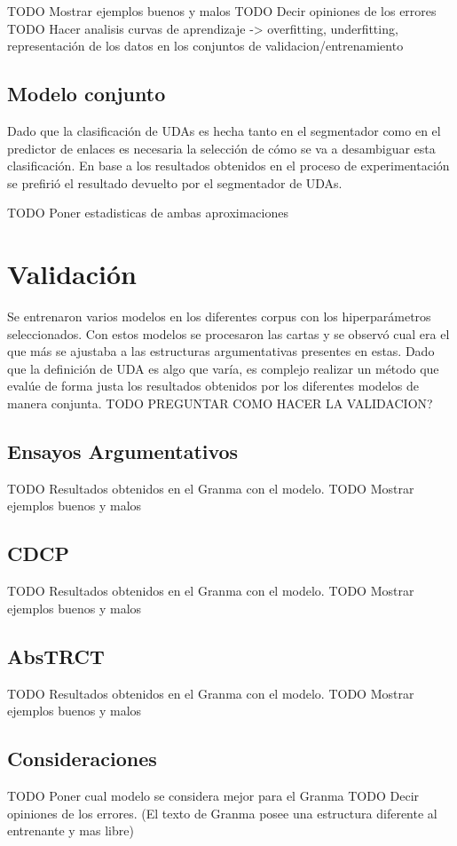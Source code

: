 TODO Mostrar ejemplos buenos y malos
TODO Decir opiniones de los errores
TODO Hacer analisis curvas de aprendizaje -> overfitting, underfitting, representación de los datos en los conjuntos de validacion/entrenamiento

\subsection{Modelo conjunto}

Dado que la clasificación de UDAs es hecha tanto en el segmentador como en el predictor de enlaces es necesaria 
la selección de cómo se va a desambiguar esta clasificación. En base a los resultados obtenidos en el proceso
de experimentación se prefirió el resultado devuelto por el segmentador de UDAs.

TODO Poner estadisticas de ambas aproximaciones

\section{Validación}

Se entrenaron varios modelos en los diferentes corpus con los hiperparámetros seleccionados. Con estos modelos 
se procesaron las cartas y se observó cual era el que más se ajustaba a las estructuras argumentativas presentes 
en estas. Dado que la definición de UDA es algo que varía, es complejo realizar un método que evalúe de forma 
justa los resultados obtenidos por los diferentes modelos de manera conjunta. TODO PREGUNTAR COMO HACER LA VALIDACION?

\subsection{Ensayos Argumentativos}

TODO Resultados obtenidos en el Granma con el modelo.
TODO Mostrar ejemplos buenos y malos

\subsection{CDCP}

TODO Resultados obtenidos en el Granma con el modelo.
TODO Mostrar ejemplos buenos y malos

\subsection{AbsTRCT}

TODO Resultados obtenidos en el Granma con el modelo.
TODO Mostrar ejemplos buenos y malos

\subsection{Consideraciones}

TODO Poner cual modelo se considera mejor para el Granma 
TODO Decir opiniones de los errores. (El texto de Granma posee una estructura diferente al entrenante y mas libre)
